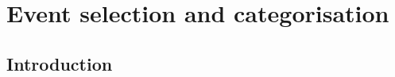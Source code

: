 \chapter{Event selection and categorisation}
\label{chap:event_select}

\newpage
\section{Introduction}
